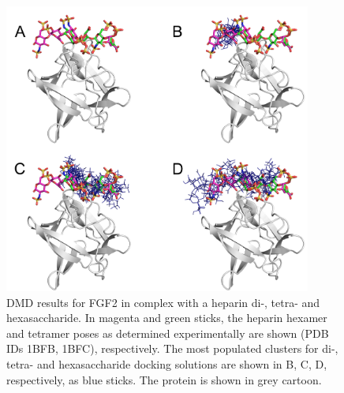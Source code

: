 \begin{figure}
\centering
\includegraphics[width=0.9\textwidth]{gfx/dmd/suppl/suppl_fgf2_dmd_he-2-4-6_02.png}
\caption[]{
DMD results for FGF2 in complex with a heparin di-, tetra- and hexasaccharide.
In magenta and green sticks, the heparin hexamer and tetramer poses as
determined experimentally are shown (PDB IDs 1BFB, 1BFC), respectively. The most
populated clusters for di-, tetra- and hexasaccharide docking solutions are
shown in B, C, D, respectively, as blue sticks. The protein is shown in grey
cartoon.
}
\label{fig:dmd:fgf2_hp_246}
\end{figure}


